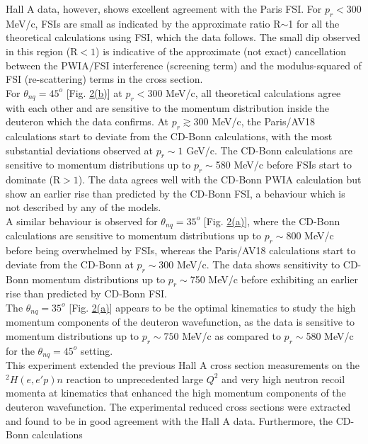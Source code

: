 Hall A data, however, shows excellent agreement with the Paris FSI. For $p_{r}<300$ MeV/c, FSIs are small as indicated by the approximate ratio R$\sim$1 for all the theoretical calculations using FSI, which the
data follows. The small dip observed in this region (R$<1$) is indicative of the approximate (not exact) cancellation between the PWIA/FSI interference (screening term) and the modulus-squared of FSI (re-scattering) terms in
the cross section. \\
\indent For $\theta_{nq}=45^{o}$ [Fig. \hyperref[fig:fig2]{2(b)}] at $p_{r}<300$ MeV/c, all theoretical calculations agree with each other and are sensitive to the momentum distribution inside the deuteron which
the data confirms. At $p_{r}\gtrsim300$ MeV/c, the Paris/AV18 calculations start to deviate from the CD-Bonn calculations, with the most substantial deviations observed at $p_{r}\sim 1$ GeV/c.
The CD-Bonn calculations are sensitive to momentum distributions up to $p_{r}\sim$580 MeV/c before FSIs start to dominate (R$>1$).
The data agrees well with the CD-Bonn PWIA calculation but show an earlier rise than predicted by the CD-Bonn FSI, a behaviour which is not described by any of the models. \\
\indent A similar behaviour is observed for $\theta_{nq}=35^{o}$ [Fig. \hyperref[fig:fig2]{2(a)}], where the CD-Bonn calculations are sensitive to momentum distributions up to $p_{r}\sim800$ MeV/c before being
overwhelmed by FSIs, whereas the Paris/AV18 calculations start to deviate from the CD-Bonn at $p_{r}\sim300$ MeV/c. The data shows sensitivity to CD-Bonn momentum distributions up to $p_{r}\sim$750 MeV/c before
exhibiting an earlier rise than predicted by CD-Bonn FSI. \\ 
\indent The $\theta_{nq}=35^{o}$ [Fig. \hyperref[fig:fig2]{2(a)}] appears to be the optimal kinematics to study the high momentum components of the deuteron wavefunction, as the data is sensitive to momentum
distributions up to $p_{r}\sim750$ MeV/c as compared to $p_{r}\sim$580 MeV/c for the $\theta_{nq}=45^{o}$ setting. \\
\indent This experiment extended the previous Hall A cross section measurements on the $^{2}H(e,e'p)n$ reaction to 
unprecedented large $Q^{2}$ and very high neutron recoil momenta at kinematics that enhanced the high momentum components of the deuteron wavefunction.
The experimental reduced cross sections were extracted and found to be in good agreement with the Hall A data. Furthermore, the CD-Bonn calculations
